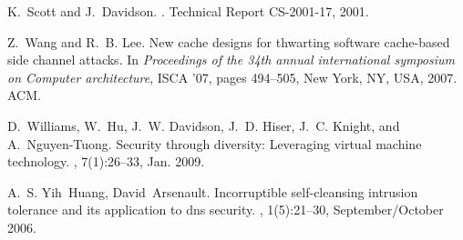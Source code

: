 \documentclass{acm_proc_article-sp}
\begin{document}
\begin{thebibliography}{10}
K.~Scott and J.~Davidson.
.
\newblock Technical Report CS-2001-17, 2001.

Z.~Wang and R.~B. Lee.
\newblock New cache designs for thwarting software cache-based side channel
  attacks.
\newblock In {\em Proceedings of the 34th annual international symposium on
  Computer architecture}, ISCA '07, pages 494--505, New York, NY, USA, 2007.
  ACM.

D.~Williams, W.~Hu, J.~W. Davidson, J.~D. Hiser, J.~C. Knight, and
  A.~Nguyen-Tuong.
\newblock Security through diversity: Leveraging virtual machine technology.
, 7(1):26--33, Jan. 2009.

A.~S. Yih~Huang, David~Arsenault.
\newblock Incorruptible self-cleansing intrusion tolerance and its application
  to dns security.
, 1(5):21--30, September/October 2006.

\end{thebibliography}
\end{document}
